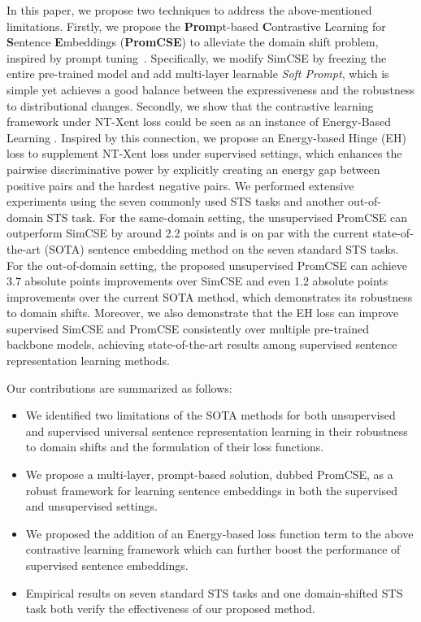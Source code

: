 \documentclass[11pt]{article}
\begin{document}
In this paper, we propose two techniques to address the above-mentioned limitations. Firstly, we propose the \textbf{Prom}pt-based \textbf{C}ontrastive Learning for \textbf{S}entence \textbf{E}mbeddings (\textbf{PromCSE}) to alleviate the domain shift problem, inspired by prompt tuning~\cite{Lester21sacle,li2021prefix}. Specifically, we modify SimCSE by freezing the entire pre-trained model and add multi-layer learnable \textit{Soft Prompt}, which is simple yet achieves a good balance between the expressiveness and the robustness to distributional changes. 
Secondly, we show that the contrastive learning framework under NT-Xent loss \cite{2020simclr} could be seen as an instance of Energy-Based Learning \cite{DBLP:journals/neco/Hinton02, lecun2006tutorial, DBLP:journals/jmlr/RanzatoBCL07}.
Inspired by this connection, we propose an Energy-based Hinge (EH) loss to supplement NT-Xent loss under supervised settings, which enhances the pairwise discriminative power by explicitly creating an energy gap between positive pairs and the hardest negative pairs.
We performed extensive experiments using the seven commonly used STS tasks and another out-of-domain STS task. For the same-domain setting, the unsupervised PromCSE can outperform SimCSE by around 2.2 points and is on par with the current state-of-the-art (SOTA) sentence embedding method on the seven standard STS tasks. For the out-of-domain setting, the proposed unsupervised PromCSE can achieve 3.7 absolute points improvements over SimCSE and even 1.2 absolute points improvements over the current SOTA method, which demonstrates its robustness to domain shifts. Moreover, we also demonstrate that the EH loss can improve supervised SimCSE and PromCSE consistently over multiple pre-trained backbone models, achieving state-of-the-art results among supervised sentence representation learning methods.






Our contributions are summarized as follows:
\begin{itemize}[noitemsep]
\item We identified two limitations of the SOTA methods for both unsupervised and supervised universal sentence representation learning in their robustness to domain shifts and the formulation of their loss functions. 
\item We propose a multi-layer, prompt-based solution, dubbed PromCSE, as a robust framework for learning sentence embeddings in both the supervised and unsupervised settings. 

\item We proposed the addition of an Energy-based loss function term to the above contrastive learning framework which can further boost the performance of supervised sentence embeddings.

\item Empirical results on seven standard STS tasks and one domain-shifted STS task both verify the effectiveness of our proposed method.
\end{itemize}
\end{document}
